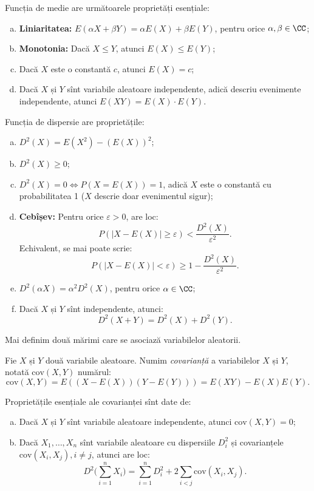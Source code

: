 Funcția de medie are următoarele proprietăți esențiale:
\begin{enumerate}[(a)]
\item \textbf{Liniaritatea:} $ E(\alpha X + \beta Y) = \alpha E(X) + \beta E(Y) $, pentru
  orice $ \alpha, \beta \in \CC $;
\item \textbf{Monotonia:} Dacă $ X \leq Y $, atunci $ E(X) \leq E(Y) $;
\item Dacă $ X $ este o constantă $ c $, atunci $ E(X) = c $;
\item Dacă $ X $ și $ Y $ sînt variabile aleatoare independente, adică descriu evenimente
  independente, atunci $ E(XY) = E(X) \cdot E(Y) $.
\end{enumerate}

Funcția de dispersie are proprietățile:
\begin{enumerate}[(a)]
\item $ D^2(X) = E(X^2) - (E(X))^2 $;
\item $ D^2(X) \geq 0 $;
\item $ D^2(X) = 0 \Leftrightarrow P(X = E(X)) = 1 $, adică $ X $ este o constantă cu
  probabilitatea 1 ($ X $ descrie doar evenimentul sigur);
\item \textbf{Cebîșev:} Pentru orice $ \varepsilon > 0 $, are loc:
  \[
    P(|X - E(X)| \geq \varepsilon) < \frac{D^2(X)}{\varepsilon^2}. 
  \]
  Echivalent, se mai poate scrie:
  \[
    P(|X - E(X)| < \varepsilon) \geq 1 - \frac{D^2(X)}{\varepsilon^2}.
  \]
\item $ D^2(\alpha X) = \alpha^2 D^2(X) $, pentru orice $ \alpha \in \CC $;
\item Dacă $ X $ și $ Y $ sînt independente, atunci:
  \[
    D^2(X + Y) = D^2(X) + D^2(Y).
  \]
\end{enumerate}

Mai definim două mărimi care se asociază variabilelor aleatorii.

\begin{definition}\label{def:cov}
  Fie $ X $ și $ Y $ două variabile aleatoare. Numim \emph{covarianță} a
  variabilelor $ X $ și $ Y $, notată $ \mathrm{cov}(X, Y) $ numărul:
  \[
    \mathrm{cov}(X, Y) = E((X - E(X))(Y - E(Y))) = E(XY) - E(X)E(Y).
  \]
\end{definition}

Proprietățile esențiale ale covarianței sînt date de:
\begin{enumerate}[(a)]
\item Dacă $ X $ și $ Y $ sînt variabile aleatoare independente, atunci
  $ \mathrm{cov}(X, Y) = 0 $;
\item Dacă $ X_1, \dots, X_n $ sînt variabile aleatoare cu dispersiile
  $ D_i^2 $ și covarianțele $ \mathrm{cov}(X_i, X_j), i \neq j $, atunci are loc:
  \[
    D^2\Big( \sum_{i = 1}^n X_i \Big) = \sum_{i = 1}^n D_i^2 + %
    2 \sum_{i < j} \mathrm{cov}(X_i, X_j).
  \]
\end{enumerate}

